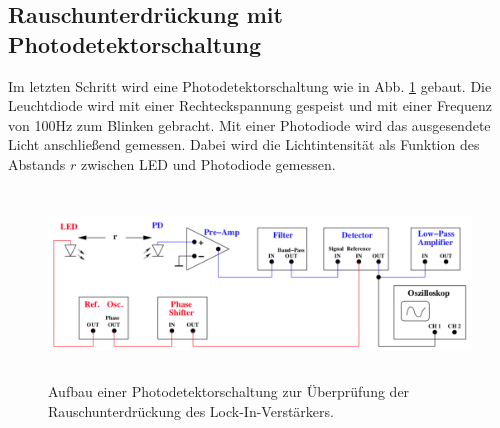 \subsection{Rauschunterdrückung mit Photodetektorschaltung} %
Im letzten Schritt wird eine Photodetektorschaltung wie in Abb. \ref{lockin3} gebaut.
Die Leuchtdiode wird mit einer Rechteckspannung gespeist und mit einer Frequenz von 100Hz zum Blinken gebracht.
Mit einer Photodiode wird das ausgesendete Licht anschließend gemessen.
Dabei wird die Lichtintensität als Funktion des Abstands $r$ zwischen LED und Photodiode gemessen.
\begin{figure}
    \centering
    \includegraphics[width=12cm, height=5cm]{build/lockin3.png}
    \caption{Aufbau einer Photodetektorschaltung zur Überprüfung der
    Rauschunterdrückung des Lock-In-Verstärkers.}
    \label{lockin3}
\end{figure}